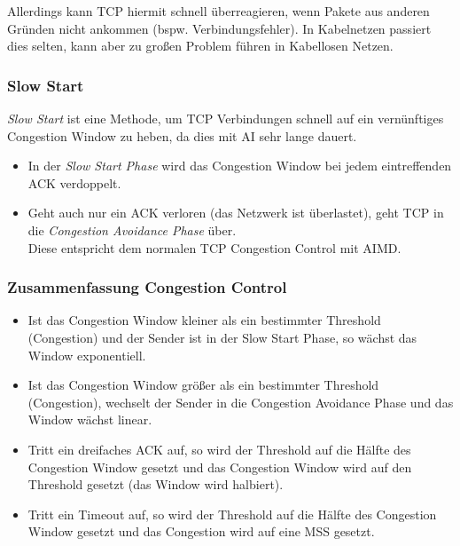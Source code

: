                 Allerdings kann TCP hiermit schnell überreagieren, wenn Pakete aus anderen Gründen nicht ankommen (bspw. Verbindungsfehler). In Kabelnetzen passiert dies selten, kann aber zu großen Problem führen in Kabellosen Netzen.

            \subsubsection{Slow Start}
                \textit{Slow Start} ist eine Methode, um TCP Verbindungen schnell auf ein vernünftiges Congestion Window zu heben, da dies mit AI sehr lange dauert.
                
                \begin{itemize}
                	\item In der \textit{Slow Start Phase} wird das Congestion Window bei jedem eintreffenden ACK verdoppelt.
                	\item Geht auch nur ein ACK verloren (das Netzwerk ist überlastet), geht TCP in die \textit{Congestion Avoidance Phase} über. \\ Diese entspricht dem normalen TCP Congestion Control mit AIMD.
                \end{itemize}
            
            \subsubsection{Zusammenfassung Congestion Control}
                \begin{itemize}
                	\item Ist das Congestion Window kleiner als ein bestimmter Threshold (Congestion) und der Sender ist in der Slow Start Phase, so wächst das Window exponentiell.
                	\item Ist das Congestion Window größer als ein bestimmter Threshold (Congestion), wechselt der Sender in die Congestion Avoidance Phase und das Window wächst linear.
                	\item Tritt ein dreifaches ACK auf, so wird der Threshold auf die Hälfte des Congestion Window gesetzt und das Congestion Window wird auf den Threshold gesetzt (das Window wird halbiert).
                	\item Tritt ein Timeout auf, so wird der Threshold auf die Hälfte des Congestion Window gesetzt und das Congestion wird auf eine MSS gesetzt.
                \end{itemize}

